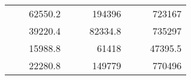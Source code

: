 \begin{table}[H]
\begin{tabular}{|ccrccrccc}
\rowcolor[HTML]{DDFDFF} 
\multicolumn{1}{|c|}{\cellcolor[HTML]{FFFFC7}}                                & \multicolumn{1}{c|}{\cellcolor[HTML]{DDFDFF}}                      & \multicolumn{1}{r|}{\cellcolor[HTML]{DAE8FC}62550.2}   & \multicolumn{1}{c|}{\cellcolor[HTML]{FFFFC7}}                                & \multicolumn{1}{c|}{\cellcolor[HTML]{DDFDFF}}                       & \multicolumn{1}{r|}{\cellcolor[HTML]{DDFDFF}194396}    & \multicolumn{1}{c|}{\cellcolor[HTML]{FFFFC7}}                                & \multicolumn{1}{c|}{\cellcolor[HTML]{DDFDFF}}                      & \multicolumn{1}{r|}{\cellcolor[HTML]{DDFDFF}723167}    \\ \cline{3-3} \cline{6-6} \cline{9-9} 
\multicolumn{1}{|c|}{\cellcolor[HTML]{FFFFC7}}                                & \multicolumn{1}{c|}{\cellcolor[HTML]{DDFDFF}}                      & \multicolumn{1}{r|}{\cellcolor[HTML]{DDFDFF}39220.4}   & \multicolumn{1}{c|}{\cellcolor[HTML]{FFFFC7}}                                & \multicolumn{1}{c|}{\cellcolor[HTML]{DDFDFF}}                       & \multicolumn{1}{r|}{\cellcolor[HTML]{DAE8FC}82334.8}   & \multicolumn{1}{c|}{\cellcolor[HTML]{FFFFC7}}                                & \multicolumn{1}{c|}{\cellcolor[HTML]{DDFDFF}}                      & \multicolumn{1}{r|}{\cellcolor[HTML]{DAE8FC}735297}    \\ \cline{3-3} \cline{6-6} \cline{9-9} 
\rowcolor[HTML]{DDFDFF} 
\multicolumn{1}{|c|}{\cellcolor[HTML]{FFFFC7}}                                & \multicolumn{1}{c|}{\cellcolor[HTML]{DDFDFF}}                      & \multicolumn{1}{r|}{\cellcolor[HTML]{DAE8FC}15988.8}   & \multicolumn{1}{c|}{\cellcolor[HTML]{FFFFC7}}                                & \multicolumn{1}{c|}{\cellcolor[HTML]{DDFDFF}}                       & \multicolumn{1}{r|}{\cellcolor[HTML]{DDFDFF}61418}     & \multicolumn{1}{c|}{\cellcolor[HTML]{FFFFC7}}                                & \multicolumn{1}{c|}{\cellcolor[HTML]{DDFDFF}}                      & \multicolumn{1}{r|}{\cellcolor[HTML]{DDFDFF}47395.5}   \\ \cline{3-3} \cline{6-6} \cline{9-9} 
\multicolumn{1}{|c|}{\cellcolor[HTML]{FFFFC7}}                                & \multicolumn{1}{c|}{\cellcolor[HTML]{DDFDFF}}                      & \multicolumn{1}{r|}{\cellcolor[HTML]{DDFDFF}22280.8}   & \multicolumn{1}{c|}{\cellcolor[HTML]{FFFFC7}}                                & \multicolumn{1}{c|}{\cellcolor[HTML]{DDFDFF}}                       & \multicolumn{1}{r|}{\cellcolor[HTML]{DAE8FC}149779}    & \multicolumn{1}{c|}{\cellcolor[HTML]{FFFFC7}}                                & \multicolumn{1}{c|}{\cellcolor[HTML]{DDFDFF}}                      & \multicolumn{1}{r|}{\cellcolor[HTML]{DAE8FC}770496}    \\ \cline{3-3} \cline{6-6} \cline{9-9} 

\end{tabular}
\end{table}
